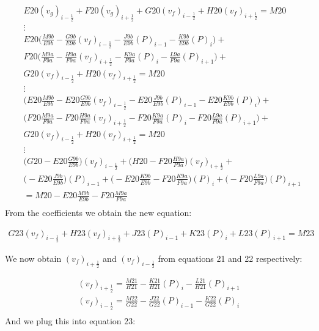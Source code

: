 \documentclass[11pt,letterpaper,titlepage]{article}
\newcommand{\half}{\frac{1}{2}}
\begin{document}
\begin{equation*}
\begin{aligned}
&E20(v_g)_{i-\half} + F20(v_g)_{i+\half} + G20(v_f)_{i-\half} + H20(v_f)_{i+\half}  = M20 \\
&\vdots\\
&E20\biggr( \frac{M9b}{E9b} - \frac{G9b}{E9b}  (v_f)_{i-\half} - \frac{J9b}{E9b}  (P)_{i-1} - \frac{K9b}{E9b}  (P)_{i} \biggr) + \\
&F20\biggr( \frac{M9a}{F9a} - \frac{H9a}{F9a}  (v_f)_{i+\half} - \frac{K9a}{F9a}  (P)_{i} - \frac{L9a}{F9a}  (P)_{i+1} \biggr) + \\
&G20(v_f)_{i-\half} + H20(v_f)_{i+\half}  = M20 \\
&\vdots\\
&\biggr( E20\frac{M9b}{E9b} - E20\frac{G9b}{E9b}  (v_f)_{i-\half} - E20\frac{J9b}{E9b}  (P)_{i-1} - E20\frac{K9b}{E9b}  (P)_{i} \biggr) + \\
&\biggr( F20\frac{M9a}{F9a} - F20\frac{H9a}{F9a}  (v_f)_{i+\half} - F20\frac{K9a}{F9a}  (P)_{i} - F20\frac{L9a}{F9a}  (P)_{i+1} \biggr) + \\
&G20(v_f)_{i-\half} + H20(v_f)_{i+\half}  = M20 \\
&\vdots\\
&\biggr( G20 - E20\frac{G9b}{E9b} \biggr)(v_f)_{i-\half} + \biggr( H20 - F20\frac{H9a}{F9a} \biggr)(v_f)_{i+\half}  +\\
&\biggr( - E20\frac{J9b}{E9b} \biggr)(P)_{i-1} + \biggr( - E20\frac{K9b}{E9b} - F20\frac{K9a}{F9a} \biggr)(P)_{i} + \biggr( - F20\frac{L9a}{F9a}  \biggr)(P)_{i+1}\\
&= M20 - E20\frac{M9b}{E9b} - F20\frac{M9a}{F9a}\\
\end{aligned}
\end{equation*}
\newline
\newline
\noindent
From the coefficients we obtain the new equation:

\begin{equation}
\begin{aligned}
G23(v_f)_{i-\half} + H23(v_f)_{i+\half} + J23(P)_{i-1} + K23(P)_{i} + L23(P)_{i+1}=M23
\end{aligned}
\end{equation}




\newpage
\noindent
We now obtain $(v_f)_{i+\half}$ and $(v_f)_{i-\half}$ from equations 21 and 22 respectively:

\begin{equation*}
\begin{aligned}
(v_f)_{i+\half}=\frac{M21}{H21} - \frac{K21}{H21}(P)_{i} - \frac{L21}{H21}(P)_{i+1}\\
(v_f)_{i-\half}=\frac{M22}{G22} - \frac{J22}{G22}(P)_{i-1} - \frac{K22}{G22}(P)_{i}\\
\end{aligned}
\end{equation*}
\newline
\noindent And we plug this into equation 23:
\end{document}
